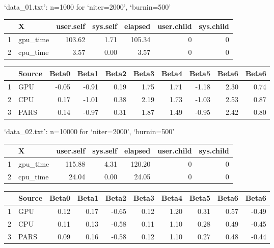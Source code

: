 \documentclass[a4paper, 11pt]{report}
\begin{document}
\begin{enumerate}[a)]
		    `data\_01.txt': n=1000 for `niter=2000', `burnin=500' 
			\begin{table}[H]
			\centering
			\begin{tabular}{rlrrrrr}
			  \hline
			 & X & user.self & sys.self & elapsed & user.child & sys.child \\ 
			  \hline
			1 & gpu\_time & 103.62 & 1.71 & 105.34 &   0 &   0 \\ 
			  2 & cpu\_time & 3.57 & 0.00 & 3.57 &   0 &   0 \\ 
			   \hline
			\end{tabular}
			\end{table}
			\begin{table}[H]
			\centering
			\begin{tabular}{rlrrrrrrrr}
			  \hline
			 & Source & Beta0 & Beta1 & Beta2 & Beta3 & Beta4 & Beta5 & Beta6 & Beta6 \\ 
			  \hline
			1 & GPU & -0.05 & -0.91 & 0.19 & 1.75 & 1.71 & -1.18 & 2.30 & 0.74 \\ 
			  2 & CPU & 0.17 & -1.01 & 0.38 & 2.19 & 1.73 & -1.03 & 2.53 & 0.87 \\ 
			  3 & PARS & 0.14 & -0.97 & 0.31 & 1.87 & 1.49 & -0.95 & 2.42 & 0.80 \\ 
			   \hline
			\end{tabular}
			\end{table}
			
		    `data\_02.txt': n=10000 for `niter=2000', `burnin=500' 
			\begin{table}[H]
			\centering
			\begin{tabular}{rlrrrrr}
			  \hline
			 & X & user.self & sys.self & elapsed & user.child & sys.child \\ 
			  \hline
			1 & gpu\_time & 115.88 & 4.31 & 120.20 &   0 &   0 \\ 
			  2 & cpu\_time & 24.04 & 0.00 & 24.05 &   0 &   0 \\ 
			   \hline
			\end{tabular}
			\end{table}
			\begin{table}[H]
			\centering
			\begin{tabular}{rlrrrrrrrr}
			  \hline
			 & Source & Beta0 & Beta1 & Beta2 & Beta3 & Beta4 & Beta5 & Beta6 & Beta6 \\ 
			  \hline
			1 & GPU & 0.12 & 0.17 & -0.65 & 0.12 & 1.20 & 0.31 & 0.57 & -0.49 \\ 
			  2 & CPU & 0.11 & 0.13 & -0.58 & 0.11 & 1.10 & 0.28 & 0.49 & -0.45 \\ 
			  3 & PARS & 0.09 & 0.16 & -0.58 & 0.12 & 1.10 & 0.27 & 0.48 & -0.44 \\ 
			   \hline
			\end{tabular}
			\end{table}
			

\end{enumerate}
\end{document}
